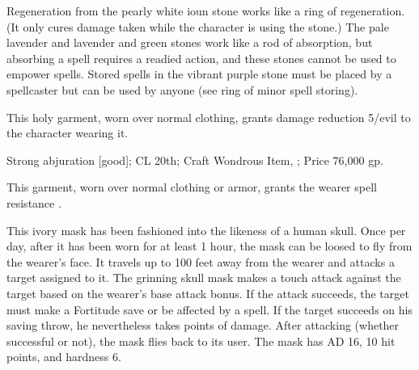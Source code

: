 Regeneration from the pearly white ioun stone works like a ring of regeneration. (It only cures damage taken while the character is using the stone.) The pale lavender and lavender and green stones work like a rod of absorption, but absorbing a spell requires a readied action, and these stones cannot be used to empower spells. Stored spells in the vibrant purple stone must be placed by a spellcaster but can be used by anyone (see ring of minor spell storing).

 This holy garment, worn over normal clothing, grants damage reduction 5/evil to the character wearing it.

Strong abjuration [good]; CL 20th; Craft Wondrous Item, ; Price 76,000 gp.

 This garment, worn over normal clothing or armor, grants the wearer spell resistance .

 This ivory mask has been fashioned into the likeness of a human skull. Once per day, after it has been worn for at least 1 hour, the mask can be loosed to fly from the wearer's face. It travels up to 100 feet away from the wearer and attacks a target assigned to it. The grinning skull mask makes a touch attack against the target based on the wearer's base attack bonus. If the attack succeeds, the target must make a Fortitude save or be affected by a  spell. If the target succeeds on his saving throw, he nevertheless takes  points of damage. After attacking (whether successful or not), the mask flies back to its user. The mask has AD 16, 10 hit points, and hardness 6.

